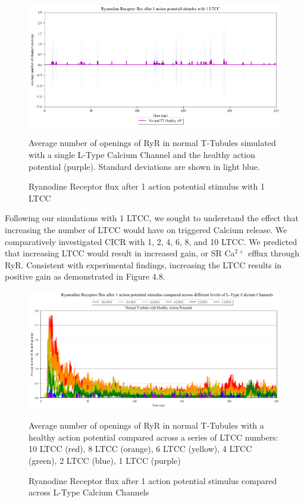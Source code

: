 \documentclass[12pt]{ucsddissertation}
\begin{document}
\setcounter{figure}{6}
\begin{figure}
	\includegraphics[scale=0.61]{RyRflux_1AP_1LTCC.png}
	\caption{Ryanodine Receptor flux after 1 action potential stimulus with 1 LTCC} Average number of openings of RyR in normal T-Tubules simulated with a single L-Type Calcium Channel and the healthy action potential (purple). Standard deviations are shown in light blue.
\label{fig:RyR flux 1 LTCC} 
\end{figure}

Following our simulations with 1 LTCC, we sought to understand the effect that increasing the number of LTCC would have on triggered Calcium release. We comparatively investigated CICR with 1, 2, 4, 6, 8, and 10 LTCC. We predicted that increasing LTCC would result in increased gain, or SR Ca$^{2+}$ efflux through RyR. Consistent with experimental findings, \cite{Cannell1995} increasing the LTCC results in positive gain as demonstrated in Figure 4.8.

\setcounter{figure}{7}
\begin{figure}
	\includegraphics[scale=0.52]{RyRflux_1AP_LTCC_hn_Comparison.png}
	\caption{Ryanodine Receptor flux after 1 action potential stimulus compared across L-Type Calcium Channels} Average number of openings of RyR in normal T-Tubules with a healthy action potential compared across a series of LTCC numbers: 10 LTCC (red), 8 LTCC (orange), 6 LTCC (yellow), 4 LTCC (green), 2 LTCC (blue), 1 LTCC (purple)
\label{fig:hnhd 1 AP LTCC RyR } 
\end{figure}
\end{document}
